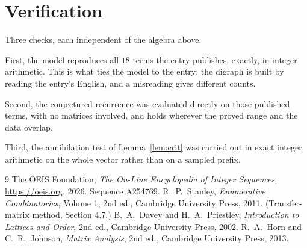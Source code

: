 \documentclass[11pt,a4paper]{article}
\theoremstyle{plain}
\theoremstyle{definition}
\begin{document}
\section{Verification}

Three checks, each independent of the algebra above.

First, the model reproduces all $18$ terms the entry publishes, exactly, in integer
arithmetic. This is what ties the model to the entry: the digraph is built by reading the
entry's English, and a misreading gives different counts.

Second, the conjectured recurrence was evaluated directly on those published terms, with no
matrices involved, and holds wherever the proved range and the data overlap.

Third, the annihilation test of Lemma~\ref{lem:crit} was carried out in exact integer
arithmetic on the whole vector rather than on a sampled prefix.

\begin{thebibliography}{9}
 The OEIS Foundation, \emph{The On-Line Encyclopedia of Integer
Sequences}, \url{https://oeis.org}, 2026. Sequence A254769.
 R.~P.~Stanley, \emph{Enumerative Combinatorics}, Volume 1, 2nd ed.,
Cambridge University Press, 2011. (Transfer-matrix method, Section 4.7.)
 B.~A.~Davey and H.~A.~Priestley, \emph{Introduction to Lattices and
Order}, 2nd ed., Cambridge University Press, 2002.
 R.~A.~Horn and C.~R.~Johnson, \emph{Matrix Analysis}, 2nd ed., Cambridge
University Press, 2013.
\end{thebibliography}
\end{document}
